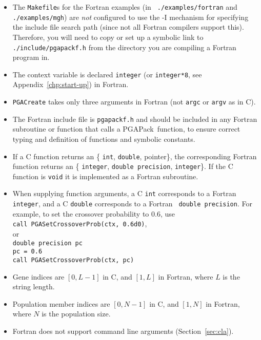 \documentclass{report}
\newcommand{\pga}{PGAPack}
\begin{document}
\begin{itemize}

\item The {\tt Makefile}s for the Fortran examples (in {\tt
./examples/fortran} and {\tt ./examples/mgh}) are {\em not} configured to use
the -I mechanism for specifying the include file search path (since not all
Fortran compilers support this).  Therefore, you will need to copy or set up a
symbolic link to {\tt ./include/pgapackf.h} from the directory you are
compiling a Fortran program in.

\item The context variable is declared {\tt integer} 
(or {\tt integer*8}, see Appendix~\ref{chp:start-up})
in Fortran.

\item {\tt PGACreate} takes only three arguments in Fortran (not {\tt argc} or
{\tt argv} as in C).

\item The Fortran include file is {\tt pgapackf.h} and should be included in
any Fortran subroutine or function that calls a \pga\ function, to ensure
correct typing and definition of functions and symbolic constants.

\item If a C function returns an \{ {\tt int}, {\tt double}, pointer\},
the corresponding Fortran function returns an \{ {\tt integer}, {\tt double
precision}, {\tt integer}\}.  If the C function is {\tt void} it is implemented
as a Fortran subroutine.

\item When supplying function arguments, a C {\tt int} corresponds to
a Fortran {\tt integer}, and a C {\tt double} corresponds to a Fortran {\tt
double precision}.
For example, to set the
crossover probability to 0.6, use\\
{\tt call PGASetCrossoverProb(ctx, 0.6d0)},\\
or\\
{\tt double precision pc}\\
{\tt pc = 0.6}\\
{\tt call PGASetCrossoverProb(ctx, pc)}

\item Gene indices are $[0,L-1]$ in C, and $[1,L]$ in Fortran, where $L$ is
the string length.

\item Population member indices are $[0,N-1]$ in C, and $[1,N]$ in Fortran,
where $N$ is the population size.

\item Fortran does not support command line arguments
(Section~\ref{sec:cla}).


\end{itemize}
\end{document}
